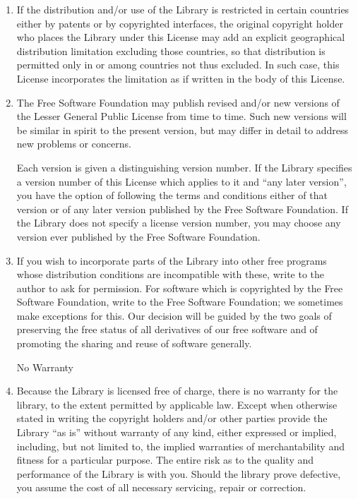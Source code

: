 {\begin{multicols}{2}
\begin{enumerate}
This section is intended to make thoroughly clear what is believed to be a 
consequence of the rest of this License. 
 
\item
If the distribution and/or use of the Library is restricted in certain countries 
either by patents or by copyrighted interfaces, the original copyright holder 
who places the Library under this License may add an explicit geographical 
distribution limitation excluding those countries, so that distribution is 
permitted only in or among countries not thus excluded. In such case, this 
License incorporates the limitation as if written in the body of this License.

\item 
The Free Software Foundation may publish revised and/or new versions of the 
Lesser General Public License from time to time. Such new versions will be 
similar in spirit to the present version, but may differ in detail to address 
new problems or concerns.
                                                                                                                                                                                                                                                              
Each version is given a distinguishing version number. If the Library specifies 
a version number of this License which applies to it and ``any later version'', 
you have the option of following the terms and conditions either of that version 
or of any later version published by the Free Software Foundation. If the 
Library does not specify a license version number, you may choose any version 
ever published by the Free Software Foundation.  

\item
If you wish to incorporate parts of the Library into other free programs whose 
distribution conditions are incompatible with these, write to the author to ask 
for permission. For software which is copyrighted by the Free Software 
Foundation, write to the Free Software Foundation; we sometimes make exceptions 
for this. Our decision will be guided by the two goals of preserving the free 
status of all derivatives of our free software and of promoting the sharing and 
reuse of software generally.

{\medskip\small \sc No Warranty}
\item
{\sc Because the Library is licensed free of charge, there is no warranty for 
the library, to the extent permitted by applicable law. Except when otherwise 
stated in writing the copyright holders and/or other parties provide the Library 
``as is'' without warranty of any kind, either expressed or implied, including, 
but not limited to, the implied warranties of merchantability and fitness for a 
particular purpose. The entire risk as to the quality and performance of the 
Library is with you. Should the library prove defective, you assume the cost of 
all necessary servicing, repair or correction.}


\end{enumerate}
\end{multicols}}
